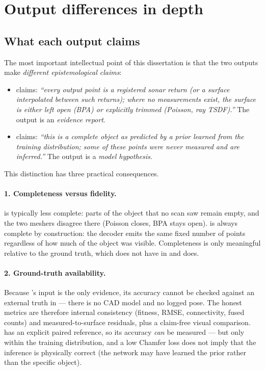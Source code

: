 \section{Output differences in depth}
\label{sec:cmp_outputs}

\subsection{What each output claims}
The most important intellectual point of this dissertation is that the two
outputs make \emph{different epistemological claims}:

\begin{itemize}
  \item \routeA{} claims: \emph{``every output point is a registered sonar
  return (or a surface interpolated between such returns); where no
  measurements exist, the surface is either left open (BPA) or explicitly
  trimmed (Poisson, ray TSDF).''} The output is an \emph{evidence report}.
  \item \routeB{} claims: \emph{``this is a complete object as predicted by a
  prior learned from the training distribution; some of these points were
  never measured and are inferred.''} The output is a \emph{model hypothesis}.
\end{itemize}

This distinction has three practical consequences.

\paragraph{1. Completeness versus fidelity.}
\routeA{} is typically less complete: parts of the object that no scan saw
remain empty, and the two meshers disagree there (Poisson closes, BPA stays
open). \routeB{} is always complete by construction: the decoder emits the
same fixed number of points regardless of how much of the object was visible.
Completeness is only meaningful relative to the ground truth, which \routeA{}
does not have in \suop{} and \routeB{} does.

\paragraph{2. Ground-truth availability.}
Because \routeA{}'s input is the only evidence, its accuracy cannot be checked
against an external truth in \suop{} --- there is no CAD model and no logged
pose. The honest metrics are therefore internal consistency (fitness, RMSE,
connectivity, fused counts) and measured-to-surface residuals, plus a
claim-free visual comparison. \routeB{} has an explicit paired reference, so
its accuracy \emph{can} be measured --- but only within the training
distribution, and a low Chamfer loss does not imply that the inference is
physically correct (the network may have learned the prior rather than the
specific object).

